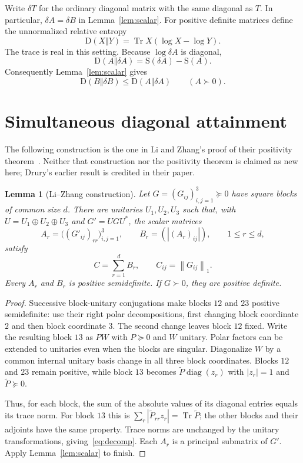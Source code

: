 \documentclass[11pt,a4paper]{article}
\newtheorem{lemma}[theorem]{Lemma}
\newcommand{\tr}{\operatorname{Tr}}
\newcommand{\Ent}{\mathrm{S}}
\newcommand{\Rel}{\mathrm{D}}
\newcommand{\diag}{\operatorname{diag}}
\newcommand{\normone}[1]{\left\lVert #1\right\rVert_1}
\begin{document}
Write $\delta T$ for the ordinary diagonal matrix with the same diagonal
as $T$. In particular, $\delta A=\delta B$ in Lemma~\ref{lem:scalar}.
For positive definite matrices define the unnormalized relative entropy
\[
 \Rel(X\Vert Y)=\tr X(\log X-\log Y).
\]
The trace is real in this setting. Because $\log\delta A$ is diagonal,
\begin{equation}\label{eq:diag-deficit}
 \Rel(A\Vert\delta A)=\Ent(\delta A)-\Ent(A).
\end{equation}
Consequently Lemma~\ref{lem:scalar} gives
\begin{equation}\label{eq:scalar-D}
 \Rel(B\Vert\delta B)\le\Rel(A\Vert\delta A)
 \qquad(A\succ0).
\end{equation}

\section{Simultaneous diagonal attainment}

The following construction is the one in Li and Zhang's proof of their
positivity theorem~\cite{lizhang}. Neither that construction nor the
positivity theorem is claimed as new here; Drury's earlier result is
credited in their paper.

\begin{lemma}[Li--Zhang construction]\label{lem:decomp}
Let $G=(G_{ij})_{i,j=1}^3\succeq0$ have square blocks of common size $d$.
There are unitaries $U_1,U_2,U_3$ such that, with
$U=U_1\oplus U_2\oplus U_3$ and $G'=UGU^*$, the scalar matrices
\[
 A_r=\bigl((G'_{ij})_{rr}\bigr)_{i,j=1}^3,
 \qquad B_r=(|(A_r)_{ij}|),\qquad 1\le r\le d,
\]
satisfy
\begin{equation}\label{eq:decomp}
 C=\sum_{r=1}^d B_r,
 \qquad C_{ij}=\normone{G_{ij}}.
\end{equation}
Every $A_r$ and $B_r$ is positive semidefinite. If $G\succ0$, they are
positive definite.
\end{lemma}

\begin{proof}
Successive block-unitary conjugations make blocks $12$ and $23$ positive
semidefinite: use their right polar decompositions, first changing block
coordinate $2$ and then block coordinate $3$. The second change leaves
block $12$ fixed. Write the resulting block $13$ as $PW$ with $P\succeq0$
and $W$ unitary. Polar factors can be extended to unitaries even when the
blocks are singular. Diagonalize $W$ by a common internal unitary basis
change in all three block coordinates. Blocks $12$ and $23$ remain
positive, while block $13$ becomes $\widetilde P\diag(z_r)$ with
$|z_r|=1$ and $\widetilde P\succeq0$.

Thus, for each block, the sum of the absolute values of its diagonal
entries equals its trace norm. For block $13$ this is
$\sum_r|\widetilde P_{rr}z_r|=\tr\widetilde P$; the other blocks and
their adjoints have the same property. Trace norms are unchanged by the
unitary transformations, giving~\eqref{eq:decomp}. Each $A_r$ is a
principal submatrix of $G'$. Apply Lemma~\ref{lem:scalar} to finish.
\end{proof}
\end{document}
